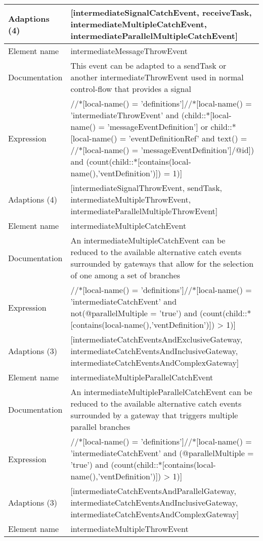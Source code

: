 \begin{center}
\begin{tiny}
\begin{longtable}{p{}|p{}}
\myrowcolour
Adaptions (4) & [intermediateSignalCatchEvent, receiveTask, intermediateMultipleCatchEvent, intermediateParallelMultipleCatchEvent]\\
\midrule
Element name & intermediateMessageThrowEvent\\
\myrowcolour
Documentation &This event can be adapted to a sendTask or another intermediateThrowEvent used in normal control-flow that provides a signal\\
Expression & //*[local-name() = 'definitions']//*[local-name() = 'intermediateThrowEvent' and (child::*[local-name() = 'messageEventDefinition'] or child::*[local-name() = 'eventDefinitionRef' and text() = //*[local-name() = 'messageEventDefinition']/@id]) and (count(child::*[contains(local-name(),'ventDefinition')]) = 1)]\\
\myrowcolour
Adaptions (4) & [intermediateSignalThrowEvent, sendTask, intermediateMultipleThrowEvent, intermediateParallelMultipleThrowEvent]\\
\midrule
Element name & intermediateMultipleCatchEvent\\
\myrowcolour
Documentation &An intermediateMultipleCatchEvent can be reduced to the available alternative catch events surrounded by gateways that allow for the selection of one among a set of branches\\
Expression & //*[local-name() = 'definitions']//*[local-name() = 'intermediateCatchEvent' and not(@parallelMultiple = 'true') and (count(child::*[contains(local-name(),'ventDefinition')]) > 1)]\\
\myrowcolour
Adaptions (3) & [intermediateCatchEventsAndExclusiveGateway, intermediateCatchEventsAndInclusiveGateway, intermediateCatchEventsAndComplexGateway]\\
\midrule
Element name & intermediateMultipleParallelCatchEvent\\
\myrowcolour
Documentation &An intermediateMultipleParallelCatchEvent can be reduced to the available alternative catch events surrounded by a gateway that triggers multiple parallel branches\\
Expression & //*[local-name() = 'definitions']//*[local-name() = 'intermediateCatchEvent' and (@parallelMultiple = 'true') and (count(child::*[contains(local-name(),'ventDefinition')]) > 1)]\\
\myrowcolour
Adaptions (3) & [intermediateCatchEventsAndParallelGateway, intermediateCatchEventsAndInclusiveGateway, intermediateCatchEventsAndComplexGateway]\\
\midrule
Element name & intermediateMultipleThrowEvent\\

\end{longtable}
\end{tiny}
\end{center}
